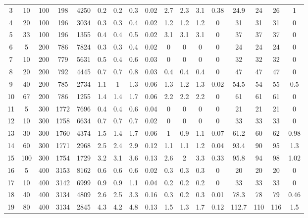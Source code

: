 \documentclass[11pt]{article}
\begin{document}
\begin{appendices}
\begin{landscape}
\begin{longtable}[c]{ccccc|cccc|cccc|cccc}
				3 & 10 & 100 & 198 & 4250 & 0.2 & 0.2 & 0.3 & 0.02 & 2.7 & 2.3 & 3.1 & 0.38 & 24.9 & 24 & 26 & 1 \\
				\rowcolor[HTML]{EFEFEF} 
				4 & 20 & 100 & 196 & 3034 & 0.3 & 0.3 & 0.4 & 0.02 & 1.2 & 1.2 & 1.2 & 0 & 31 & 31 & 31 & 0 \\
				\rowcolor[HTML]{EFEFEF} 
				5 & 33 & 100 & 196 & 1355 & 0.4 & 0.4 & 0.5 & 0.02 & 3.1 & 3.1 & 3.1 & 0 & 37 & 37 & 37 & 0 \\
				6 & 5 & 200 & 786 & 7824 & 0.3 & 0.3 & 0.4 & 0.02 & 0 & 0 & 0 & 0 & 24 & 24 & 24 & 0 \\
				7 & 10 & 200 & 779 & 5631 & 0.5 & 0.4 & 0.6 & 0.03 & 0 & 0 & 0 & 0 & 32 & 32 & 32 & 0 \\
				8 & 20 & 200 & 792 & 4445 & 0.7 & 0.7 & 0.8 & 0.03 & 0.4 & 0.4 & 0.4 & 0 & 47 & 47 & 47 & 0 \\
				9 & 40 & 200 & 785 & 2734 & 1.1 & 1 & 1.3 & 0.06 & 1.3 & 1.2 & 1.3 & 0.02 & 54.5 & 54 & 55 & 0.5 \\
				10 & 67 & 200 & 786 & 1255 & 1.4 & 1.4 & 1.7 & 0.06 & 2.2 & 2.2 & 2.2 & 0 & 61 & 61 & 61 & 0 \\
				\rowcolor[HTML]{EFEFEF} 
				11 & 5 & 300 & 1772 & 7696 & 0.4 & 0.4 & 0.6 & 0.04 & 0 & 0 & 0 & 0 & 21 & 21 & 21 & 0 \\
				\rowcolor[HTML]{EFEFEF} 
				12 & 10 & 300 & 1758 & 6634 & 0.7 & 0.7 & 0.7 & 0.02 & 0 & 0 & 0 & 0 & 33 & 33 & 33 & 0 \\
				\rowcolor[HTML]{EFEFEF} 
				13 & 30 & 300 & 1760 & 4374 & 1.5 & 1.4 & 1.7 & 0.06 & 1 & 0.9 & 1.1 & 0.07 & 61.2 & 60 & 62 & 0.98 \\
				\rowcolor[HTML]{EFEFEF} 
				14 & 60 & 300 & 1771 & 2968 & 2.5 & 2.4 & 2.9 & 0.12 & 1.1 & 1.1 & 1.2 & 0.04 & 93.4 & 90 & 95 & 1.3 \\
				\rowcolor[HTML]{EFEFEF} 
				15 & 100 & 300 & 1754 & 1729 & 3.2 & 3.1 & 3.6 & 0.13 & 2.6 & 2 & 3.3 & 0.33 & 95.8 & 94 & 98 & 1.02 \\
				16 & 5 & 400 & 3153 & 8162 & 0.6 & 0.6 & 0.6 & 0.02 & 0.3 & 0.3 & 0.3 & 0 & 20 & 20 & 20 & 0 \\
				17 & 10 & 400 & 3142 & 6999 & 0.9 & 0.9 & 1.1 & 0.04 & 0.2 & 0.2 & 0.2 & 0 & 33 & 33 & 33 & 0 \\
				18 & 40 & 400 & 3134 & 4809 & 2.6 & 2.5 & 3.3 & 0.16 & 0.3 & 0.2 & 0.3 & 0.01 & 78.3 & 78 & 79 & 0.46 \\
				19 & 80 & 400 & 3134 & 2845 & 4.3 & 4.2 & 4.8 & 0.13 & 1.5 & 1.3 & 1.7 & 0.12 & 112.7 & 110 & 116 & 1.5 \\

\end{longtable}
\end{landscape}
\end{appendices}
\end{document}
